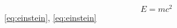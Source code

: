 \begin{equation} E = mc^2 \label{eq:einstein} \end{equation}\quad {}\eqref{eq:einstein}, \ref{eq:einstein}
